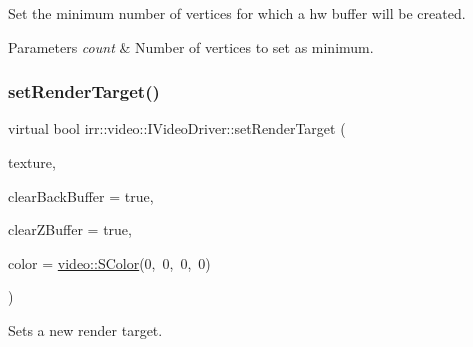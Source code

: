 Set the minimum number of vertices for which a hw buffer will be created. 


\begin{DoxyParams}{Parameters}
{\em count} & Number of vertices to set as minimum. \\
\hline
\end{DoxyParams}
\mbox{\label{classirr_1_1video_1_1IVideoDriver_a8c38a8d8d6d49be53bda55eb0749e7eb}} 
\subsubsection{\texorpdfstring{set\+Render\+Target()}{setRenderTarget()}\hspace{0.1cm}{\footnotesize\ttfamily [1/2]}}
{\footnotesize\ttfamily virtual bool irr\+::video\+::\+I\+Video\+Driver\+::set\+Render\+Target (\begin{DoxyParamCaption}\item[{\hyperlink{classirr_1_1video_1_1ITexture}{video\+::\+I\+Texture} $\ast$}]{texture,  }\item[{bool}]{clear\+Back\+Buffer = {\ttfamily true},  }\item[{bool}]{clear\+Z\+Buffer = {\ttfamily true},  }\item[{\hyperlink{classirr_1_1video_1_1SColor}{S\+Color}}]{color = {\ttfamily \hyperlink{classirr_1_1video_1_1SColor}{video\+::\+S\+Color}(0,~0,~0,~0)} }\end{DoxyParamCaption})\hspace{0.3cm}{\ttfamily [pure virtual]}}



Sets a new render target. 


